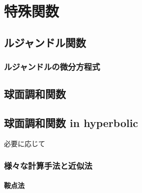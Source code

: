 \chapter{特殊関数}
\section{ルジャンドル関数}
\subsection{ルジャンドルの微分方程式}
\section{球面調和関数}
\section{球面調和関数 in hyperbolic}

必要に応じて
\subsection{様々な計算手法と近似法}
\subsubsection{鞍点法}